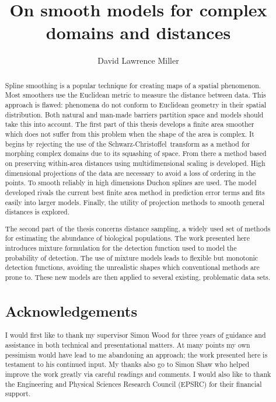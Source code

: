 \documentclass[12pt]{report}
\title{On smooth models for complex domains and distances}
\author{David Lawrence Miller}
\newcommand{\sch}{Schwarz-Christoffel}
\begin{document}
\maketitle

%



\begin{abstract} 
Spline smoothing is a popular technique for creating maps of a spatial phenomenon. Most smoothers use the Euclidean metric to measure the distance between data. This approach is flawed: phenomena do not conform to Euclidean geometry in their spatial distribution. Both natural and man-made barriers partition space and models should take this into account. The first part of this thesis develops a finite area smoother which does not suffer from this problem when the shape of the area is complex. It begins by rejecting the use of the \sch\ transform as a method for morphing complex domains due to its squashing of space. From there a method based on preserving within-area distances using multidimensional scaling is developed. High dimensional projections of the data are necessary to avoid a loss of ordering in the points. To smooth reliably in high dimensions Duchon splines are used. The model developed rivals the current best finite area method in prediction error terms and fits easily into larger models. Finally, the utility of projection methods to smooth general distances is explored.

The second part of the thesis concerns distance sampling, a widely used set of methods for estimating the abundance of biological populations. The work presented here introduces mixture formulation for the detection function used to model the probability of detection. The use of mixture models leads to flexible but monotonic detection functions, avoiding the unrealistic shapes which conventional methods are prone to. These new models are then applied to several existing, problematic data sets.

\newpage

\begin{center}
\section*{Acknowledgements}
\end{center}
I would first like to thank my supervisor Simon Wood for three years of guidance and assistance in both technical and presentational matters. At many points my own pessimism would have lead to me abandoning an approach; the work presented here is testament to his continued input.  My thanks also go to Simon Shaw who helped improve the work greatly via careful readings and comments. I would also like to thank the Engineering and Physical Sciences Research Council (EPSRC) for their financial support.


\end{abstract}
\end{document}
